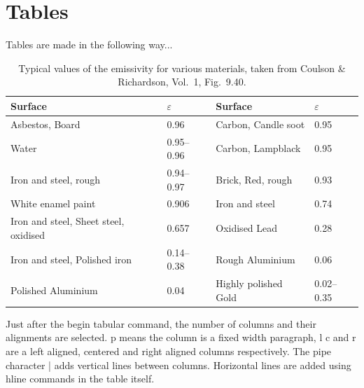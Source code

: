 \documentclass[12pt,MEng]{UoAThesis}
\begin{document}
\section{Tables}

Tables are made in the following way...
\begin{table}
  \begin{center}
    \begin{tabular}{|p{4cm}|p{2cm}|||p{4cm}|p{2cm}|}
      Surface & $\varepsilon$ & Surface & $\varepsilon$ 
      \\\hline\hline%
      Asbestos, Board & 0.96 & Carbon, Candle soot & 0.95 \\
      Water & 0.95--0.96 & Carbon, Lampblack & 0.95\\
      Iron and steel, rough & 0.94--0.97 & Brick, Red, rough & 0.93\\
      White enamel paint & 0.906 & Iron and steel & 0.74\\
      Iron and steel, Sheet steel, oxidised & 0.657 & Oxidised Lead  & 0.28\\
      Iron and steel, Polished iron & 0.14--0.38 & Rough Aluminium & 0.06\\
      Polished Aluminium & 0.04 & Highly polished Gold & 0.02--0.35
    \end{tabular}
  \end{center}
  \caption[Typical values of the emissivity for various materials]{
    Typical values of the emissivity for various materials, 
    taken from Coulson \& Richardson, Vol.~1, Fig.~9.40.}
\end{table}

Just after the begin tabular command, the number of columns and their
alignments are selected. p means the column is a fixed width
paragraph, l c and r are a left aligned, centered and right aligned
columns respectively. The pipe character | adds vertical lines between
columns. Horizontal lines are added using hline commands in the table
itself.
\end{document}
